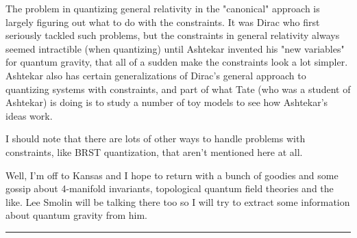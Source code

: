 The problem in quantizing general relativity in the "canonical" approach
is largely figuring out what to do with the constraints.  It was Dirac
who first seriously tackled such problems, but the constraints in
general relativity always seemed intractible (when quantizing) until
Ashtekar invented his "new variables" for quantum gravity, that all of a
sudden make the constraints look a lot simpler.  Ashtekar also has
certain generalizations of Dirac's general approach to quantizing
systems with constraints, and part of what Tate (who was a student of
Ashtekar) is doing is to study a number of toy models to see how
Ashtekar's ideas work.

I should note that there are lots of other ways to handle problems with
constraints, like BRST quantization, that aren't mentioned here at all.

Well, I'm off to Kansas and I hope to return with a bunch of goodies and
some gossip about 4-manifold invariants, topological quantum field
theories and the like.  Lee Smolin will be talking there too so I will
try to extract some information about quantum gravity from him.
\par\noindent\rule{\textwidth}{0.4pt}

